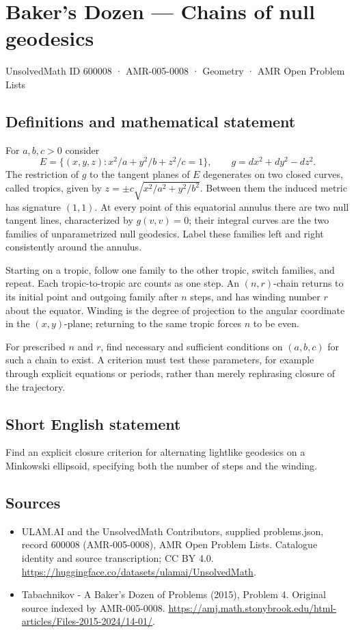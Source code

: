 \documentclass[11pt,a4paper]{article}
\begin{document}
\section*{Baker's Dozen — Chains of null geodesics}\label{600008}
{\small UnsolvedMath ID 600008 · AMR-005-0008 · Geometry · AMR Open Problem Lists}
\subsection{Definitions and mathematical statement}
For $a,b,c>0$ consider
\[
 E=\{(x,y,z):x^2/a+y^2/b+z^2/c=1\},\qquad
 g=dx^2+dy^2-dz^2.
\]
The restriction of $g$ to the tangent planes of $E$ degenerates on two closed
curves, called tropics, given by
$z=\pm c\sqrt{x^2/a^2+y^2/b^2}$. Between them the induced metric has signature
$(1,1)$. At every point of this equatorial annulus there are two null tangent
lines, characterized by $g(v,v)=0$; their integral curves are the two families
of unparametrized null geodesics. Label these families left and right
consistently around the annulus.

Starting on a tropic, follow one family to the other tropic, switch families,
and repeat. Each tropic-to-tropic arc counts as one step. An $(n,r)$-chain
returns to its initial point and outgoing family after $n$ steps, and has
winding number $r$ about the equator. Winding is the degree of projection
to the angular coordinate in the $(x,y)$-plane; returning to the same tropic
forces $n$ to be even.

For prescribed $n$ and $r$, find necessary and sufficient conditions on
$(a,b,c)$ for such a chain to exist. A criterion must test these parameters,
for example through explicit equations or periods, rather than merely
rephrasing closure of the trajectory.
\subsection{Short English statement}
Find an explicit closure criterion for alternating lightlike geodesics on
a Minkowski ellipsoid, specifying both the number of steps and the winding.
\subsection{Sources}
\begin{itemize}
\item[S1] ULAM.AI and the UnsolvedMath Contributors, supplied problems.json, record 600008 (AMR-005-0008), AMR Open Problem Lists. Catalogue identity and source transcription; CC BY 4.0.
\url{https://huggingface.co/datasets/ulamai/UnsolvedMath}.
\item[S2] Tabachnikov - A Baker's Dozen of Problems (2015), Problem 4. Original source indexed by AMR-005-0008.
\url{https://amj.math.stonybrook.edu/html-articles/Files-2015-2024/14-01/}.
\end{itemize}
\end{document}
